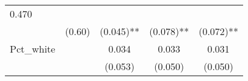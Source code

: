 \documentclass[12pt,twoside]{reedthesis}
\begin{document}
\begin{longtable}[]{@{}lcccc@{}}
\begin{minipage}[t]{0.14\columnwidth}
  0.470\strut
  \end{minipage}\tabularnewline
  \begin{minipage}[t]{0.26\columnwidth}\raggedright\strut
  \strut
  \end{minipage} & \begin{minipage}[t]{0.12\columnwidth}\centering\strut
  (0.60)\strut
  \end{minipage} & \begin{minipage}[t]{0.14\columnwidth}\centering\strut
  (0.045)**\strut
  \end{minipage} & \begin{minipage}[t]{0.14\columnwidth}\centering\strut
  (0.078)**\strut
  \end{minipage} & \begin{minipage}[t]{0.14\columnwidth}\centering\strut
  (0.072)**\strut
  \end{minipage}\tabularnewline
  \begin{minipage}[t]{0.26\columnwidth}\raggedright\strut
  Pct\_white\strut
  \end{minipage} & \begin{minipage}[t]{0.12\columnwidth}\centering\strut
  \strut
  \end{minipage} & \begin{minipage}[t]{0.14\columnwidth}\centering\strut
  0.034\strut
  \end{minipage} & \begin{minipage}[t]{0.14\columnwidth}\centering\strut
  0.033\strut
  \end{minipage} & \begin{minipage}[t]{0.14\columnwidth}\centering\strut
  0.031\strut
  \end{minipage}\tabularnewline
  \begin{minipage}[t]{0.26\columnwidth}\raggedright\strut
  \strut
  \end{minipage} & \begin{minipage}[t]{0.12\columnwidth}\centering\strut
  \strut
  \end{minipage} & \begin{minipage}[t]{0.14\columnwidth}\centering\strut
  (0.053)\strut
  \end{minipage} & \begin{minipage}[t]{0.14\columnwidth}\centering\strut
  (0.050)\strut
  \end{minipage} & \begin{minipage}[t]{0.14\columnwidth}\centering\strut
  (0.050)\strut
  \end{minipage}\tabularnewline

\end{longtable}
\end{document}
